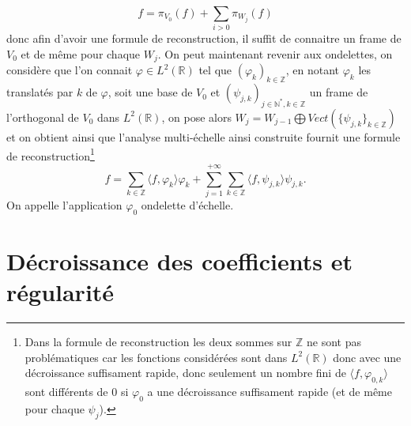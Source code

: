 \begin{equation}
	f = \pi_{V_0}(f) +\sum_{i>0} \pi_{W_j}(f) 
\end{equation}
donc afin d'avoir une formule de reconstruction, il suffit de connaitre un frame de $V_0$ et de même pour chaque $W_j$. 
On peut maintenant revenir aux ondelettes, on considère que l'on connait $\varphi \in L^2(\mathbb{R})$ tel que $(\varphi_{k})_{k\in \mathbb{Z}}$, en notant $\varphi_k$ les translatés par $k$ de $\varphi$, soit une base de $V_0$ et $(\psi_{j,k})_{j\in \mathbb{N}^*, k \in \mathbb{Z}}$ un frame de l'orthogonal de $V_0$ dans $L^2(\mathbb{R})$, on pose alors $W_j = W_{j-1} \bigoplus Vect(\{\psi_{j,k}\}_{k\in \mathbb{Z}})$ et on obtient ainsi que l'analyse multi-échelle ainsi construite fournit une formule de reconstruction\footnote{Dans la formule de reconstruction les deux sommes sur $\mathbb{Z}$ ne sont pas problématiques car les fonctions considérées sont dans $L^2(\mathbb{R})$ donc avec une décroissance suffisament rapide, donc seulement un nombre fini de $\langle f, \varphi_{0,k} \rangle$ sont différents de 0 si $\varphi_0$ a une décroissance suffisament rapide (et de même pour chaque $\psi_j$).}
\begin{equation}
	f = \sum_{k\in \mathbb{Z}} \langle f, \varphi_{k} \rangle \varphi_{k} + \sum_{j = 1}^{+\infty} \sum_{k\in \mathbb{Z}} \langle f, \psi_{j,k} \rangle \psi_{j,k}.
\end{equation}
On appelle l'application $\varphi_0$ ondelette d'échelle.

\section{Décroissance des coefficients et régularité}

